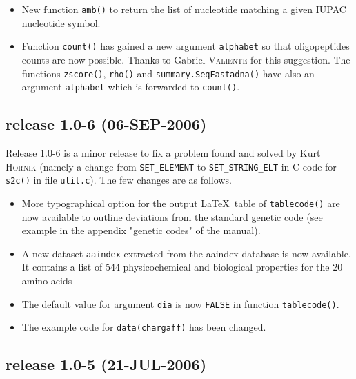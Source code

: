 \documentclass{article}
\begin{document}
\begin{itemize}
\item New function \texttt{amb()} to return the list of nucleotide matching
a given IUPAC nucleotide symbol.

\item Function \texttt{count()} has gained a new argument \texttt{alphabet}
so that oligopeptides counts are now possible. Thanks to Gabriel \textsc{Valiente}
for this suggestion. The functions \texttt{zscore()}, \texttt{rho()} and
\texttt{summary.SeqFastadna()} have also an argument \texttt{alphabet} which
is forwarded to \texttt{count()}.

\end{itemize}

\subsection*{release 1.0-6 (06-SEP-2006)}

Release 1.0-6 is a minor release to fix a problem found and solved by Kurt \textsc{Hornik}
(namely a change from \texttt{SET\_ELEMENT} to \texttt{SET\_STRING\_ELT}
in C code for \texttt{s2c()} in file \texttt{util.c}). The few changes are
as follows.

\begin{itemize}

\item More typographical option for the output \LaTeX~table of \texttt{tablecode()}
are now available to outline deviations from the standard genetic code (see example in the
appendix "genetic codes" of the manual).

\item A new dataset \texttt{aaindex} extracted from the aaindex database
\cite{aaindex1, aaindex2, aaindex3} is now available. It contains a list
of 544 physicochemical and biological properties for the 20 amino-acids

\item The default value for argument \texttt{dia} is now \texttt{FALSE}
in function \texttt{tablecode()}.

\item The example code for \texttt{data(chargaff)} has been changed.

\end{itemize}

\subsection*{release 1.0-5 (21-JUL-2006)}
\end{document}
